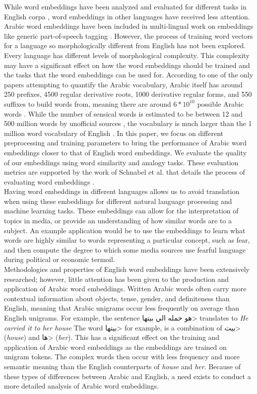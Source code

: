 While word embeddings have been analyzed and evaluated for different tasks in English corpa \cite{mikoloveffic:2013,dos2014deep}, word embeddings in other languages have received less attention. Arabic word embeddings have been included in multi-lingual work on embeddings like generic part-of-speech tagging \cite{al:2013}. However, the process of training word vectors for a language so morphologically different from English has not been explored. Every language has different levels of morphological complexity. This complexity may have a significant effect on how the word embeddings should be trained and the tasks that the word embeddings can be used for. According to one of the only papers attempting to quantify the Arabic vocabulary, Arabic itself has around 250 prefixes, 4500 regular derivative roots, 1000 derivative regular forms, and 550 suffixes to build words from, meaning there are around $6*10^{10}$ possible Arabic words \cite{ahmed2000alarge}. While the number of sensical words is estimated to be between 12 and 500 million words by unofficial sources \cite{Lameen:2013,Muhammad:2015}, the vocabulary is much larger than the 1 million word vocabulary of English \cite{Googl96:online}. In this paper, we focus on different preprocessing and training parameters to bring the performance of Arabic word embeddings closer to that of English word embeddings. We evaluate the quality of our embeddings using word similarity and analogy tasks. These evaluation metrics are supported by the work of Schnabel et al. that details the process of evaluating word embeddings \cite{schnabel2015evaluation}.
\\
Having word embeddings in different languages allows us to avoid translation when using these embeddings for different natural language processing and machine learning tasks. These embeddings can allow for the interpretation of topics in media, or provide an understanding of how similar words are to a subject. An example application would be to use the embeddings to learn what words are highly similar to words representing a particular concept, such as fear, and then compute the degree to which some media sources use fearful language during political or economic termoil.
\\
Methodologies and properties of English word embeddings have been extensively researched; however, little attention has been given to the production and application of Arabic word embeddings. Written Arabic words often carry more contextual information about objects, tense, gender, and definiteness than English, meaning that Arabic unigrams occur less frequently on average than English unigrams. For example, the sentence \<هو حمله الي بيتها> translates to \textit{He carried it to her house} The word \<بيتها> for example, is a combination of \<بيت> (\textit{house}) and \<ها> (\textit{her}). This has a significant effect on the training and application of Arabic word embeddings as the embeddings are trained on unigram tokens. The complex words then occur with less frequency and more semantic meaning than the English counterparts of \textit{house} and \textit{her}. Because of these types of differences between Arabic and English, a need exists to conduct a more detailed analysis of Arabic word embeddings.
